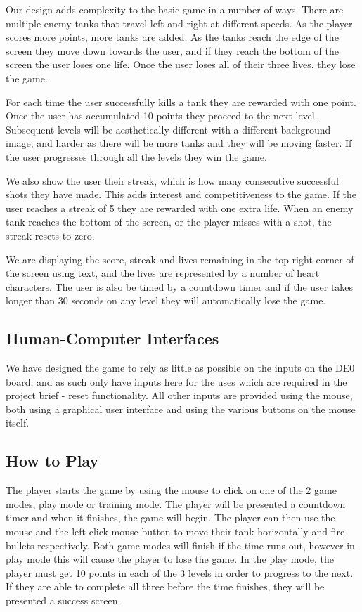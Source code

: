 \documentclass{article}
\begin{document}
Our design adds complexity to the basic game in a number of ways. There are multiple enemy tanks that travel left and right at different speeds. As the player scores more points, more tanks are added. As the tanks reach the edge of the screen they move down towards the user, and if they reach the bottom of the screen the user loses one life. Once the user loses all of their three lives, they lose the game.

For each time the user successfully kills a tank they are rewarded with one point. Once the user has accumulated 10 points they proceed to the next level. Subsequent levels will be aesthetically different with a different background image, and harder as there will be more tanks and they will be moving faster. If the user progresses through all the levels they win the game.

We also show the user their streak, which is how many consecutive successful shots they have made. This adds interest and competitiveness to the game. If the user reaches a streak of 5 they are rewarded with one extra life. When an enemy tank reaches the bottom of the screen, or the player misses with a shot, the streak resets to zero.

We are displaying the score, streak and lives remaining in the top right corner of the screen using text, and the lives are represented by a number of heart characters. The user is also be timed by a countdown timer and if the user takes longer than 30 seconds on any level they will automatically lose the game.

\subsection{Human-Computer Interfaces}

We have designed the game to rely as little as possible on the inputs on the DE0 board, and as such only have inputs here for the uses which are required in the project brief - reset functionality. All other inputs are provided using the mouse, both using a graphical user interface and using the various buttons on the mouse itself.

\subsection{How to Play}

The player starts the game by using the mouse to click on one of the 2 game modes, play mode or training mode.
The player will be presented a countdown timer and when it finishes, the game will begin. The player can then use the mouse and the left click mouse button to move their tank horizontally and fire bullets respectively. Both game modes will finish if the time runs out, however in play mode this will cause the player to lose the game. In the play mode, the player must get 10 points in each of the 3 levels in order to progress to the next. If they are able to complete all three before the time finishes, they will be presented a success screen.
\end{document}
